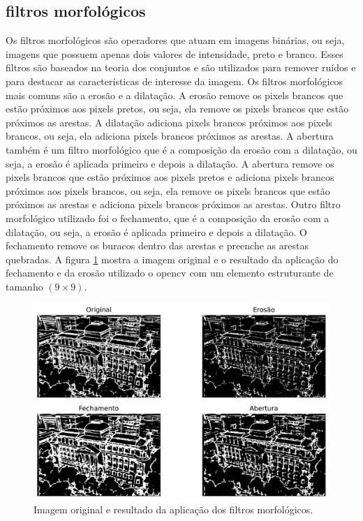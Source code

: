 \documentclass[12pt]{article}
\begin{document}
\subsection{filtros morfológicos}

Os filtros morfológicos \cite{HIPR2} são operadores que atuam em imagens binárias, ou seja, imagens que possuem apenas dois valores de intensidade, preto e branco. Esses filtros são baseados na teoria dos conjuntos e são utilizados para remover ruídos e para destacar as características de interesse da imagem. Os filtros morfológicos mais comuns são a erosão e a dilatação. A erosão remove os pixels brancos que estão próximos aos pixels pretos, ou seja, ela remove os pixels brancos que estão próximos as arestas. A dilatação adiciona pixels brancos próximos aos pixels brancos, ou seja, ela adiciona pixels brancos próximos as arestas. A abertura também é um filtro morfológico que é a composição da erosão com a dilatação, ou seja, a erosão é aplicada primeiro e depois a dilatação. A abertura remove os pixels brancos que estão próximos aos pixels pretos e adiciona pixels brancos próximos aos pixels brancos, ou seja, ela remove os pixels brancos que estão próximos as arestas e adiciona pixels brancos próximos as arestas. Outro filtro morfológico utilizado foi o fechamento, que é a composição da erosão com a dilatação, ou seja, a erosão é aplicada primeiro e depois a dilatação. O fechamento remove os buracos dentro das arestas e preenche as arestas quebradas. A figura \ref{fig:morf} mostra a imagem original e o resultado da aplicação do fechamento e da erosão utilizado o opencv \cite{opencv_morphology} com um elemento estruturante de tamanho $(9\times9)$.

\begin{figure}
\centering
\includegraphics[scale=0.60]{morf.pdf}
\caption{Imagem original e resultado da aplicação dos filtros morfológicos.}
\label{fig:morf}
\end{figure}
\end{document}
